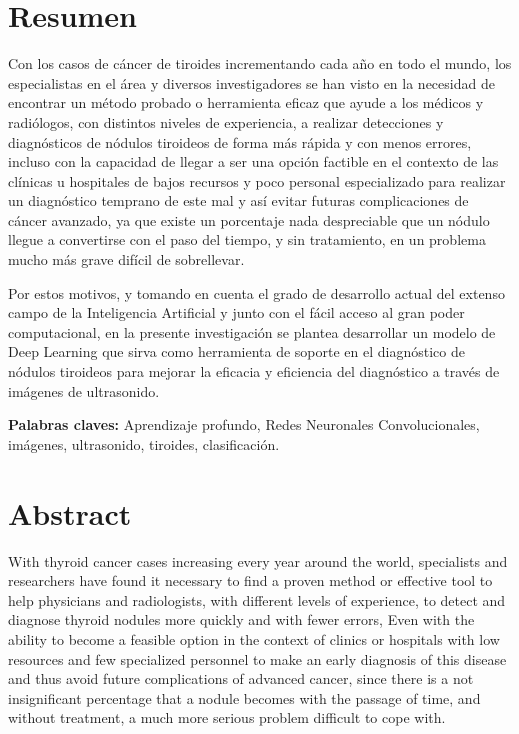 
\chapter*{Resumen}

Con los casos de cáncer de tiroides incrementando cada año en todo el mundo, los especialistas en el área y diversos investigadores se han visto en la necesidad de encontrar un método probado o herramienta eficaz que ayude a los médicos y radiólogos, con distintos niveles de experiencia, a realizar detecciones y diagnósticos de nódulos tiroideos de forma más rápida y con menos errores, incluso con la capacidad de llegar a ser una opción factible en el contexto de las clínicas u hospitales de bajos recursos y poco personal especializado para realizar un diagnóstico temprano de este mal y así evitar futuras complicaciones de cáncer avanzado, ya que existe un porcentaje nada despreciable que un nódulo llegue a convertirse con el paso del tiempo, y sin tratamiento, en un problema mucho más grave difícil de sobrellevar. 

Por estos motivos, y tomando en cuenta el grado de desarrollo actual del extenso campo de la Inteligencia Artificial y junto con el fácil acceso al gran poder computacional, en la presente investigación se plantea desarrollar un modelo de Deep Learning que sirva como herramienta de soporte en el diagnóstico de nódulos tiroideos para mejorar la eficacia y eficiencia del diagnóstico a través de imágenes de ultrasonido.
\newline

\textbf{Palabras claves: } Aprendizaje profundo, Redes Neuronales Convolucionales, imágenes, ultrasonido, tiroides, clasificación.

\clearpage
\chapter*{Abstract}
With thyroid cancer cases increasing every year around the world,  specialists and researchers have found it necessary to find a proven method or effective tool to help physicians and radiologists, with different levels of experience, to detect and diagnose thyroid nodules more quickly and with fewer errors, Even with the ability to become a feasible option in the context of clinics or hospitals with low resources and few specialized personnel to make an early diagnosis of this disease and thus avoid future complications of advanced cancer, since there is a not insignificant percentage that a nodule becomes with the passage of time, and without treatment, a much more serious problem difficult to cope with. 

